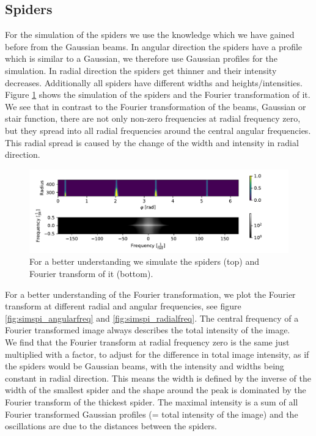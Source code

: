 \subsection{Spiders}
\label{sec:Fourier_spiders}
For the simulation of the spiders we use the knowledge which we have gained before from the Gaussian beams. In angular direction the spiders have a profile which is similar to a Gaussian, we therefore use Gaussian profiles for the simulation. In radial direction the spiders get thinner and their intensity decreases. Additionally all spiders have different widths and heights/intensities. Figure \ref{fig:simulated_spyder} shows the simulation of the spiders and the Fourier transformation of it. We see that in contrast to the Fourier transformation of the beams, Gaussian or stair function, there are not only non-zero frequencies at radial frequency zero, but they spread into all radial frequencies around the central angular frequencies. This radial spread is caused by the change of the width and intensity in radial direction.\\
\begin{figure}[H]
	\centering
		\includegraphics[width=1.1\textwidth]{pics/simulated_spyder.pdf}
		\caption{For a better understanding we simulate the spiders (top) and Fourier transform of it (bottom).}
		\label{fig:simulated_spyder}
\end{figure}
For a better understanding of the Fourier transformation, we plot the Fourier transform at different radial and angular frequencies, see figure \ref{fig:simspi_angularfreq} and \ref{fig:simspi_radialfreq}. The central frequency of a Fourier transformed image always describes the total intensity of the image.\\
We find that the Fourier transform at radial frequency zero is the same just multiplied with a factor, to adjust for the difference in total image intensity, as if the spiders would be Gaussian beams, with the intensity and widths being constant in radial direction. This means the width is defined by the inverse of the width of the smallest spider and the shape around the peak is dominated by the Fourier transform of the thickest spider. The maximal intensity is a sum of all Fourier transformed Gaussian profiles (= total intensity of the image) and the oscillations are due to the distances between the spiders. \\
